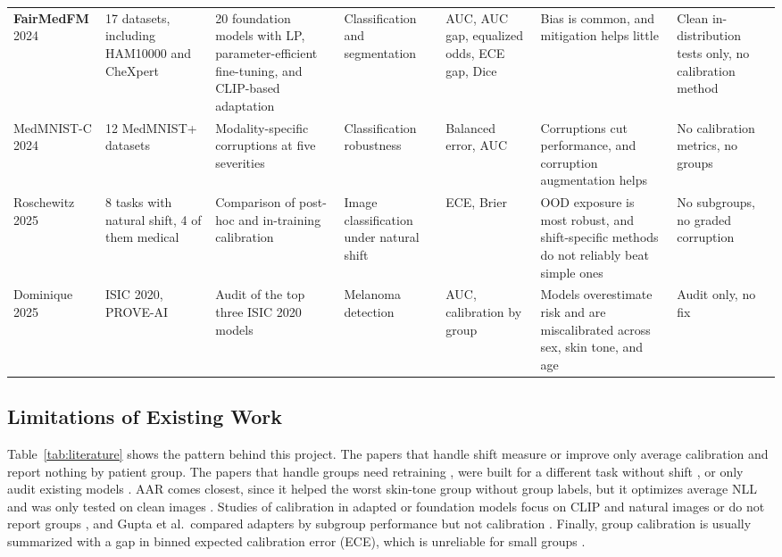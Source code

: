 \documentclass[sigconf,nonacm]{acmart}
\begin{document}
\begin{table}[t]
\begin{tabularx}{\textwidth}{@{}P{1.75cm}P{2.3cm}LP{1.9cm}P{1.85cm}LP{2.55cm}@{}}
    \addlinespace
    \textbf{FairMedFM} 2024 \cite{jin2024fairmedfm} & 17 datasets, including HAM10000 and CheXpert & 20 foundation models with LP, parameter-efficient fine-tuning, and CLIP-based adaptation & Classification and segmentation & AUC, AUC gap, equalized odds, ECE gap, Dice & Bias is common, and mitigation helps little & Clean in-distribution tests only, no calibration method \\
    \addlinespace
    MedMNIST-C 2024 \cite{disalvo2024medmnistc} & 12 MedMNIST+ datasets & Modality-specific corruptions at five severities & Classification robustness & Balanced error, AUC & Corruptions cut performance, and corruption augmentation helps & No calibration metrics, no groups \\
    \addlinespace
    Roschewitz 2025 \cite{roschewitz2025where} & 8 tasks with natural shift, 4 of them medical & Comparison of post-hoc and in-training calibration & Image classification under natural shift & ECE, Brier & OOD exposure is most robust, and shift-specific methods do not reliably beat simple ones & No subgroups, no graded corruption \\
    \addlinespace
    Dominique 2025 \cite{dominique2025calibration} & ISIC 2020, PROVE-AI & Audit of the top three ISIC 2020 models & Melanoma detection & AUC, calibration by group & Models overestimate risk and are miscalibrated across sex, skin tone, and age & Audit only, no fix \\
    \bottomrule
  \end{tabularx}
\end{table}

\subsection{Limitations of Existing Work}

Table~\ref{tab:literature} shows the pattern behind this project. The papers that handle shift \cite{ovadia2019trust,tomani2021posthoc,tomani2023dac,roschewitz2025where,hekler2023tta} measure or improve only average calibration and report nothing by patient group. The papers that handle groups need retraining \cite{shui2023clusterfocal}, were built for a different task without shift \cite{salvador2022faircal}, or only audit existing models \cite{dominique2025calibration}. AAR comes closest, since it helped the worst skin-tone group without group labels, but it optimizes average NLL and was only tested on clean images \cite{yuksekgonul2023atypicality}. Studies of calibration in adapted or foundation models focus on CLIP and natural images \cite{tu2024empirical,oh2024calibrated,murugesan2024robust} or do not report groups \cite{hekler2025beyond,huang2026uncertainty,lin2026crsbench}, and Gupta et al.\ compared adapters by subgroup performance but not calibration \cite{gupta2026subgroup}. Finally, group calibration is usually summarized with a gap in binned expected calibration error (ECE), which is unreliable for small groups \cite{kumar2019verified,riccilara2023calibration}.
\end{document}

